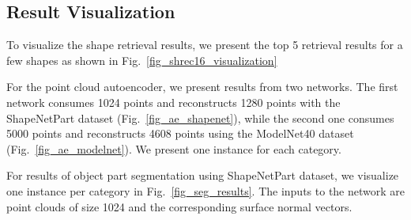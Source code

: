 \documentclass[10pt,twocolumn,letterpaper]{article}
\begin{document}
\subsection{Result Visualization}
To visualize the shape retrieval results, we present the top 5 retrieval results for a few shapes as shown in Fig.~\ref{fig_shrec16_visualization}

For the point cloud autoencoder, we present results from two networks. The first network consumes 1024 points and reconstructs 1280 points with the ShapeNetPart dataset (Fig.~\ref{fig_ae_shapenet}), while the second one consumes 5000 points and reconstructs 4608 points using the ModelNet40 dataset (Fig.~\ref{fig_ae_modelnet}). We present one instance for each category. 

For results of object part segmentation using ShapeNetPart dataset, we visualize one instance per category in Fig.~\ref{fig_seg_results}. The inputs to the network are point clouds of size 1024 and the corresponding surface normal vectors.
\end{document}
